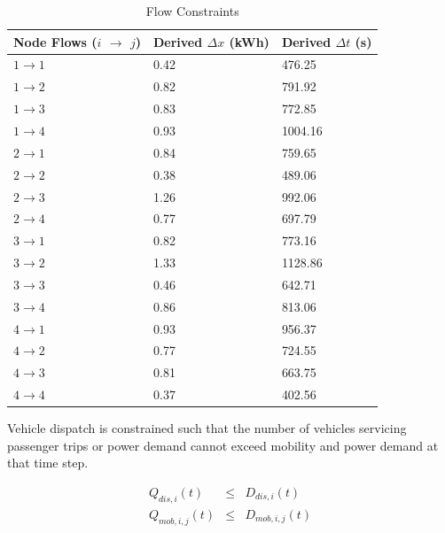 \documentclass[journal]{IEEEtran}
\begin{document}
\begin{table}[!htbp]
    \renewcommand{\arraystretch}{1}
    \caption{Flow Constraints}
    \label{tab:flow_constraints}
    \centering
    \def\colmargin{6.75cm}
    \begin{tabular}{lll}
    \hline
    \textbf{Node Flows ($i$ $\rightarrow$ $j$)} & \textbf{Derived} $\Delta x$ (kWh) & \textbf{Derived} $\Delta t$ (s) \\
    \hline
    $1\rightarrow1$ & 0.42  & 476.25  \\
    $1\rightarrow2$ & 0.82  & 791.92  \\
    $1\rightarrow3$ & 0.83  & 772.85  \\
    $1\rightarrow4$ & 0.93  & 1004.16  \\
    $2\rightarrow1$ & 0.84  & 759.65  \\
    $2\rightarrow2$ & 0.38  & 489.06  \\
    $2\rightarrow3$ & 1.26  & 992.06  \\
    $2\rightarrow4$ & 0.77  & 697.79  \\
    $3\rightarrow1$ & 0.82  & 773.16  \\
    $3\rightarrow2$ & 1.33  & 1128.86  \\
    $3\rightarrow3$ & 0.46  & 642.71  \\
    $3\rightarrow4$ & 0.86  & 813.06  \\
    $4\rightarrow1$ & 0.93  & 956.37  \\
    $4\rightarrow2$ & 0.77  & 724.55  \\
    $4\rightarrow3$ & 0.81  & 663.75  \\
    $4\rightarrow4$ & 0.37  & 402.56  \\
    \hline
    \end{tabular}
\end{table}

Vehicle dispatch is constrained such that the number of vehicles servicing passenger trips or power demand cannot exceed mobility and power demand at that time step.

\begin{eqnarray*}
   Q_{dis,i}(t) & \le & D_{dis,i}(t) \\
   Q_{mob,i,j}(t) & \le & D_{mob,i,j}(t) \\
\end{eqnarray*}
\end{document}
